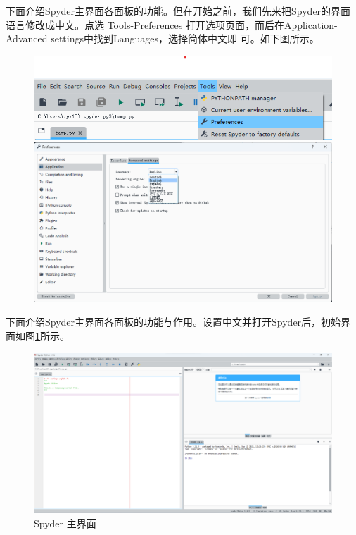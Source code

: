 \documentclass[UTF8]{ctexart}
\begin{document}
下面介绍Spyder主界面各面板的功能。但在开始之前，我们先来把Spyder的界面语言修改成中文。点选 
Tools-Preferences 打开选项页面，而后在Application-Advanced settings中找到Languages，选择简体中文即
可。如下图所示。
\begin{figure}[htbp]
    \begin{minipage}[h]{0.3\linewidth}
        \centering
        \includegraphics*[height=0.3\linewidth]{pic/Spyder_Language_1.png}
    \end{minipage}
    \hfill
    \begin{minipage}[h]{0.6\linewidth}
        \centering
        \includegraphics*[height=0.4\linewidth]{pic/Spyder_Language_2.png}
    \end{minipage}
\end{figure}
\newpage
下面介绍Spyder主界面各面板的功能与作用。设置中文并打开Spyder后，初始界面如图\ref{fig:spyderMain}所示。
\begin{figure}[htbp]
    \centering
    \includegraphics[width=0.7\linewidth]{pic/spyder主界面.png}
    \caption{Spyder 主界面}
    \label{fig:spyderMain}
\end{figure}
\end{document}

